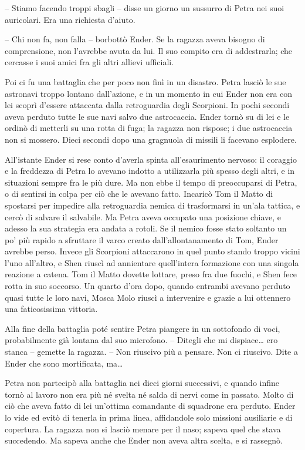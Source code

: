 {-- Stiamo facendo troppi sbagli -- disse un giorno un sussurro di Petra
	nei suoi auricolari. Era una richiesta d'aiuto.}

{-- Chi non fa, non falla -- borbottò Ender. Se la ragazza aveva bisogno
	di comprensione, non l'avrebbe avuta da lui. Il suo compito era di
	addestrarla; che cercasse i suoi amici fra gli altri allievi ufficiali.}

{Poi ci fu una battaglia che per poco non finì in un disastro. Petra
	lasciò le sue astronavi troppo lontano dall'azione, e in un momento in
	cui Ender non era con lei scoprì d'essere attaccata dalla retroguardia
	degli Scorpioni. In pochi secondi aveva perduto tutte le sue navi salvo
	due astrocaccia. Ender tornò su di lei e le ordinò di metterli su una
	rotta di fuga; la ragazza non rispose; i due astrocaccia non si mossero.
	Dieci secondi dopo una gragnuola di missili li facevano esplodere.}

{All'istante Ender si rese conto d'averla spinta all'esaurimento
	nervoso: il coraggio e la freddezza di Petra lo avevano indotto a
	utilizzarla più spesso degli altri, e in situazioni sempre fra le più
	dure. Ma non ebbe il tempo di preoccuparsi di Petra, o di sentirsi in
	colpa per ciò che le avevano fatto. Incaricò Tom il Matto di spostarsi
	per impedire alla retroguardia nemica di trasformarsi in un'ala tattica,
	e cercò di salvare il salvabile. Ma Petra aveva occupato una posizione
	chiave, e adesso la sua strategia era andata a rotoli. Se il nemico
	fosse stato soltanto un po' più rapido a sfruttare il varco creato
	dall'allontanamento di Tom, Ender avrebbe perso. Invece gli Scorpioni
	attaccarono in quel punto stando troppo vicini l'uno all'altro, e Shen
	riuscì ad annientare quell'intera formazione con una singola reazione a
	catena. Tom il Matto dovette lottare, preso fra due fuochi, e Shen fece
	rotta in suo soccorso. Un quarto d'ora dopo, quando entrambi avevano
	perduto quasi tutte le loro navi, Mosca Molo riuscì a intervenire e
	grazie a lui ottennero una faticosissima vittoria.}

{Alla fine della battaglia poté sentire Petra piangere in un sottofondo
	di voci, probabilmente già lontana dal suo microfono. -- Ditegli che mi
	dispiace\ldots{} ero stanca -- gemette la ragazza. -- Non riuscivo più a
	pensare. Non ci riuscivo. Dite a Ender che sono mortificata, ma\ldots{}}

{Petra non partecipò alla battaglia nei dieci giorni successivi, e
	quando infine tornò al lavoro non era più né svelta né salda di nervi
	come in passato. Molto di ciò che aveva fatto di lei un'ottima
	comandante di squadrone era perduto. Ender lo vide ed evitò di tenerla
	in prima linea, affidandole solo missioni ausiliarie e di copertura. La
	ragazza non si lasciò menare per il naso; sapeva quel che stava
	succedendo. Ma sapeva anche che Ender non aveva altra scelta, e si
	rassegnò.}

